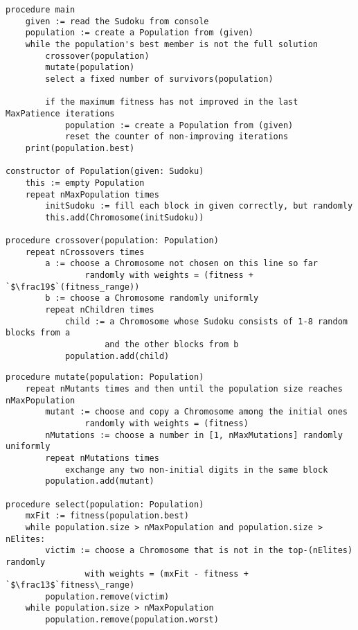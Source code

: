 \documentclass[10pt]{article}
\begin{document}
\begin{lstlisting}[language=pseu, style=lststyle]
procedure main
    given := read the Sudoku from console
    population := create a Population from (given)
    while the population's best member is not the full solution
        crossover(population)
        mutate(population)
        select a fixed number of survivors(population)

        if the maximum fitness has not improved in the last MaxPatience iterations
            population := create a Population from (given)
            reset the counter of non-improving iterations
    print(population.best)

constructor of Population(given: Sudoku)
    this := empty Population
    repeat nMaxPopulation times
        initSudoku := fill each block in given correctly, but randomly
        this.add(Chromosome(initSudoku))

procedure crossover(population: Population)
    repeat nCrossovers times
        a := choose a Chromosome not chosen on this line so far
                randomly with weights = (fitness + `$\frac19$`(fitness_range))
        b := choose a Chromosome randomly uniformly
        repeat nChildren times
            child := a Chromosome whose Sudoku consists of 1-8 random blocks from a
                    and the other blocks from b
            population.add(child)
\end{lstlisting}
\pagebreak
\begin{lstlisting}[language=pseu, style=lststyle, firstnumber=last]
procedure mutate(population: Population)
    repeat nMutants times and then until the population size reaches nMaxPopulation
        mutant := choose and copy a Chromosome among the initial ones
                randomly with weights = (fitness)
        nMutations := choose a number in [1, nMaxMutations] randomly uniformly
        repeat nMutations times
            exchange any two non-initial digits in the same block
        population.add(mutant)
    
procedure select(population: Population)
    mxFit := fitness(population.best)
    while population.size > nMaxPopulation and population.size > nElites:
        victim := choose a Chromosome that is not in the top-(nElites) randomly
                with weights = (mxFit - fitness + `$\frac13$`fitness\_range)
        population.remove(victim)
    while population.size > nMaxPopulation
        population.remove(population.worst)
\end{lstlisting}
\end{document}
